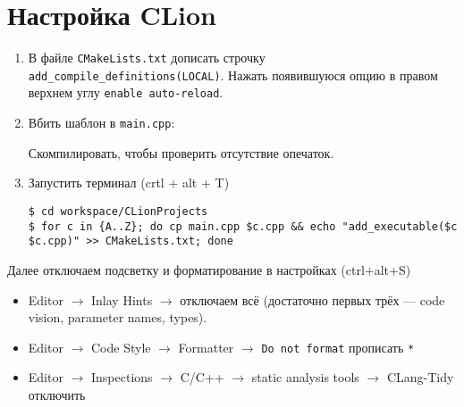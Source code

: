 \section{Настройка CLion}
\begin{enumerate}
    \item В файле \texttt{CMakeLists.txt} дописать строчку \texttt{add\_compile\_definitions(LOCAL)}.
    Нажать появившуюся опцию в правом верхнем углу \texttt{enable auto-reload}.
    \item Вбить шаблон в \texttt{main.cpp}:
    
    Скомпилировать, чтобы проверить отсутствие опечаток.
    \item Запустить терминал (crtl + alt + T)
    \begin{lstlisting}
$ cd workspace/CLionProjects
$ for c in {A..Z}; do cp main.cpp $c.cpp && echo "add_executable($c $c.cpp)" >> CMakeLists.txt; done\end{lstlisting}
\end{enumerate}
Далее отключаем подсветку и форматирование в настройках (ctrl+alt+S)
\begin{itemize}
    \item Editor $\to$ Inlay Hints $\to$ отключаем всё (достаточно первых трёх --- code vision, parameter names, types).
    \item Editor $\to$ Code Style $\to$ Formatter $\to$ \texttt{Do not format} прописать \texttt{*}
    \item Editor $\to$ Inspections $\to$ C/C++ $\to$ static analysis tools $\to$ CLang-Tidy отключить
\end{itemize}